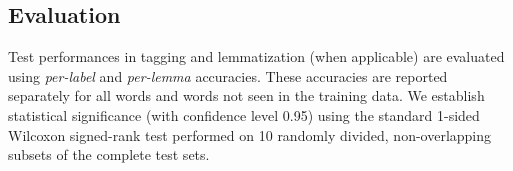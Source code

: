 \documentclass[smallextended]{svjour3}       %
\begin{document}




\subsection{Evaluation}

Test performances in tagging and lemmatization (when applicable) are evaluated using \emph{per-label} and \emph{per-lemma} accuracies. These accuracies are reported separately for all words and words not seen in the training data. We establish statistical significance (with confidence level 0.95) using the standard 1-sided Wilcoxon signed-rank test performed on 10 randomly divided, non-overlapping subsets of the complete test sets. 
\end{document}
